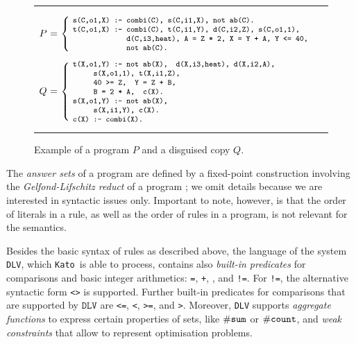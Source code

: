 \documentclass{tlp}
\newcommand{\dlv}{\texttt{DLV}\xspace}
\newcommand{\kato}[0]{\texttt{Kato}\xspace}
\begin{document}
\begin{figure}
\hrule
\medskip
\begin{center}
$\begin{array}{r@{~}c@{~}l}
P & =  & \left \{\ 
\begin{minipage}{10cm}
{
\footnotesize
\begin{verbatim}
s(C,o1,X) :- combi(C), s(C,i1,X), not ab(C).
t(C,o1,X) :- combi(C), t(C,i1,Y), d(C,i2,Z), s(C,o1,1), 
             d(C,i3,heat), A = Z * 2, X = Y + A, Y <= 40, 
             not ab(C).
\end{verbatim}
}
\end{minipage} \right .\\
\\[-.2em]
Q & =  & \left\{\ 
\begin{minipage}{9cm}
{\footnotesize
\begin{verbatim}
t(X,o1,Y) :- not ab(X),  d(X,i3,heat), d(X,i2,A), 
     s(X,o1,1), t(X,i1,Z),
     40 >= Z,  Y = Z + B, 
     B = 2 * A,  c(X).

s(X,o1,Y) :- not ab(X),
     s(X,i1,Y), c(X).
c(X) :- combi(X).
\end{verbatim}
}
\end{minipage} \right .
\end{array}$
\medskip
\hrule
\caption{Example of a program $P$ and a  disguised copy $Q$.}\label{fig:example}
\end{center}
\end{figure}


The \emph{answer sets} of a program are defined by a fixed-point construction involving the \emph{Gelfond-Lifschitz reduct} of a program \cite{gelf-lifs-91}; we omit details because we are interested in syntactic issues only.
Important to note, however, is that the order of literals in a rule, as well as the order of rules in a program, is not relevant for the semantics. 

Besides the basic syntax of rules as described above, the language of the system \dlv, which \kato\ is able to process,   
contains also \emph{built-in  predicates} for comparisons and basic integer arithmetics:
 {\tt =}, {\tt +}, {\tt *}, and 
{\tt !=}. For  {\tt !=}, the alternative syntactic form {\tt <>} is supported. 
Further built-in predicates for comparisons that are supported by $\dlv$ are
{\tt <=}, {\tt <}, {\tt >=}, and {\tt >}.
Moreover, \dlv supports \emph{aggregate functions} to express certain properties of sets, like $\tt \#sum$  or $\tt \#count$, and \emph{weak constraints} 
that allow to represent optimisation problems.
\end{document}

